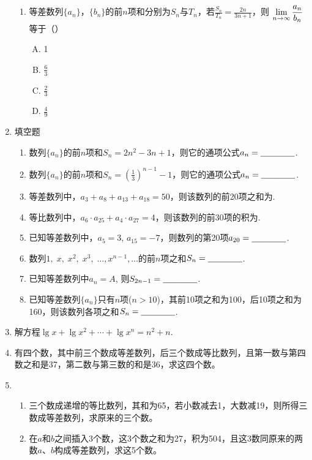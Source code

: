 \begin{enumerate}
\begin{enumerate}[(1)]
\item 等差数列$\{a_n\}$，$\{b_n\}$的前$n$项和分别为$S_n$与$T_n$，若$\frac{S_n}{T_n}=\frac{2n}{3n+1}$，则
$\lim\limits_{n\to \infty}\dfrac{a_n}{b_n}$等于（\qquad ）
\begin{multicols}{4}
\begin{enumerate}[(A)]
    \item 1
    \item $\frac{6}{3}$
    \item $\frac{2}{3}$
    \item $\frac{4}{9}$
\end{enumerate}
\end{multicols}

\end{enumerate}


\item     填空题
\begin{enumerate}[(1)]
    \item 数列$\{a_n\}$的前$n$项和$S_n=2n^2-3n+1$，则它的通项公式$a_n=\underline{\qquad}\underline{\qquad}$.
    \item 数列$\{a_n\}$的前$n$项和$S_n=\left(\frac{1}{3}\right)^{n-1}-1$，则它的通项公式$a_n=\underline{\qquad}\underline{\qquad}$.
    \item 等差数列中，$a_3+a_8+a_{13}+a_{18}=50$，则该数列的前20项之和为\blank\blank.
    \item 等比数列中，$a_6\cdot a_{25}+a_4\cdot a_{27}=4$，则该数列的前30项的积为\blank\blank.
    \item  已知等差数列中，$a_5=3$, $a_{15}=-7$，则数列的第20项$a_{20}=\underline{\qquad}\underline{\qquad}$.
    \item  数列$1,\; x,\; x^2,\;x^3,\;\ldots, x^{n-1},\ldots$的前$n$项之和$S_n=\underline{\qquad}\underline{\qquad}$.
    \item 已知等差数列中$a_n=A$, 则$S_{2n-1}=\underline{\qquad}\underline{\qquad}$.
    \item 已知等差数列$\{a_n\}$只有$n$项($n>10$)，其前10项之和为100，后10项之和为160，则该数列各项之和$S_n=\underline{\qquad}\underline{\qquad}$.
\end{enumerate}
   
\item 解方程$\lg x+\lg x^2+\cdots+ \lg x^n=n^2+n$.

\item 有四个数，其中前三个数成等差数列，后三个数成等比数列，且第一数与第四数之和是37，第二数与第三数的和是36，求这四个数。
\item 
\begin{enumerate}[(1)]
 \item 三个数成递增的等比数列，其和为65，若小数减去1，大数减19，则所得三数成等差数列，求原来的三个数。
\item 在$a$和$b$之间插入3个数，这3个数之和为27，积为504，且这3数同原来的两数$a$、$b$构成等差数列，求这5个数。
\end{enumerate}


\end{enumerate}

